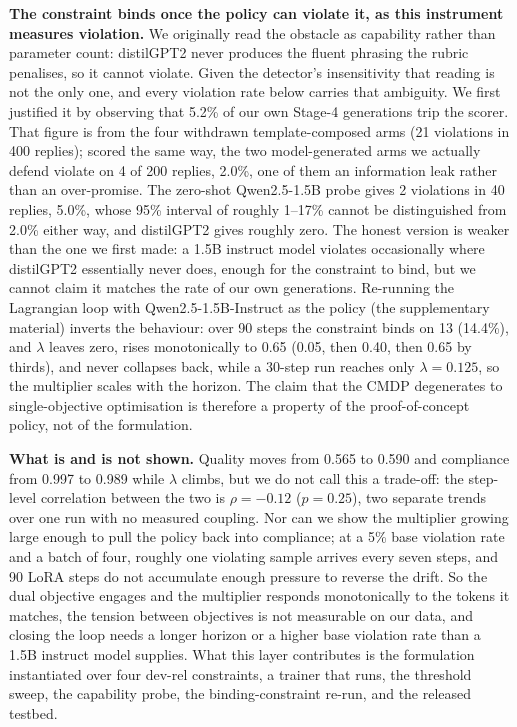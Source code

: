 \documentclass[11pt]{article}
\begin{document}
  \textbf{The constraint binds once the policy can violate it, as this instrument measures
  violation.} We originally read the obstacle as capability rather than parameter count:
  distilGPT2 never produces the fluent phrasing the rubric penalises, so it cannot violate. Given
  the detector's insensitivity that reading is not the only one, and every violation rate below
  carries that ambiguity. We first justified it by observing that 5.2\% of our own Stage-4
  generations trip the scorer. That figure is from the four withdrawn template-composed arms (21
  violations in 400 replies); scored the same way, the two model-generated arms we actually defend
  violate on 4 of 200 replies, 2.0\%, one of them an information leak rather than an over-promise.
  The zero-shot Qwen2.5-1.5B probe gives 2 violations in 40 replies, 5.0\%, whose 95\% interval of
  roughly 1--17\% cannot be distinguished from 2.0\% either way, and distilGPT2 gives roughly
  zero. The honest version is weaker than the one we first made: a 1.5B instruct model violates
  occasionally where distilGPT2 essentially never does, enough for the constraint to bind, but we
  cannot claim it matches the rate of our own generations. Re-running the Lagrangian loop with
  Qwen2.5-1.5B-Instruct as the policy (the supplementary material) inverts the behaviour:
  over 90 steps the constraint binds on 13 (14.4\%), and $\lambda$ leaves zero, rises
  monotonically to 0.65 (0.05, then 0.40, then 0.65 by thirds), and never collapses back, while a
  30-step run reaches only $\lambda = 0.125$, so the multiplier scales with the horizon. The claim
  that the CMDP degenerates to single-objective optimisation is therefore a property of the
  proof-of-concept policy, not of the formulation.

  \textbf{What is and is not shown.} Quality moves from 0.565 to 0.590 and compliance from 0.997
  to 0.989 while $\lambda$ climbs, but we do not call this a trade-off: the step-level correlation
  between the two is $\rho = -0.12$ ($p = 0.25$), two separate trends over one run with no
  measured coupling. Nor can we show the multiplier growing large enough to pull the policy back
  into compliance; at a 5\% base violation rate and a batch of four, roughly one violating sample
  arrives every seven steps, and 90 LoRA steps do not accumulate enough pressure to reverse the
  drift. So the dual objective engages and the multiplier responds monotonically to the tokens it
  matches, the tension between objectives is not measurable on our data, and closing the loop
  needs a longer horizon or a higher base violation rate than a 1.5B instruct model supplies. What
  this layer contributes is the formulation instantiated over four dev-rel constraints, a trainer
  that runs, the threshold sweep, the capability probe, the binding-constraint re-run, and the
  released testbed.
\end{document}
